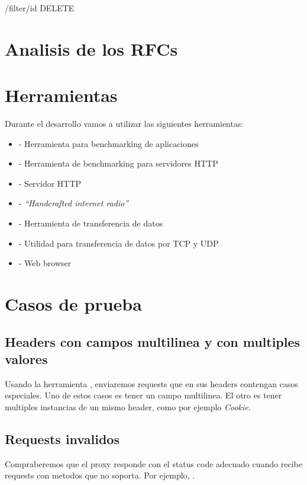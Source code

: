 \documentclass[11pt,a4paper,titlepage]{article}
\begin{document}
/filter/id
DELETE

\section{Analisis de los RFCs}

\section{Herramientas}
    Durante el desarrollo vamos a utilizar las siguientes herramientas:
    \begin{itemize}
        \item {} - Herramienta para benchmarking de aplicaciones
        \item {} - Herramienta de benchmarking para servidores HTTP
        \item {} - Servidor HTTP
        \item {} - \emph{``Handcrafted internet radio''}
        \item {} - Herramienta de transferencia de datos
        \item {} - Utilidad para transferencia de datos por TCP y UDP
        \item {} - Web browser
    \end{itemize}

\section{Casos de prueba}
\subsection{Headers con campos multilinea y con multiples valores}
Usando la herramienta , enviaremos requests que en sus headers contengan casos especiales.
Uno de estos casos es tener un campo multilinea.
El otro es tener multiples instancias de un mismo header, como por ejemplo \textit{Cookie}.

\subsection{Requests invalidos}
Compraberemos que el proxy responde con el status code adecuado cuando recibe requests con metodos que no soporta.
Por ejemplo, .
\end{document}
